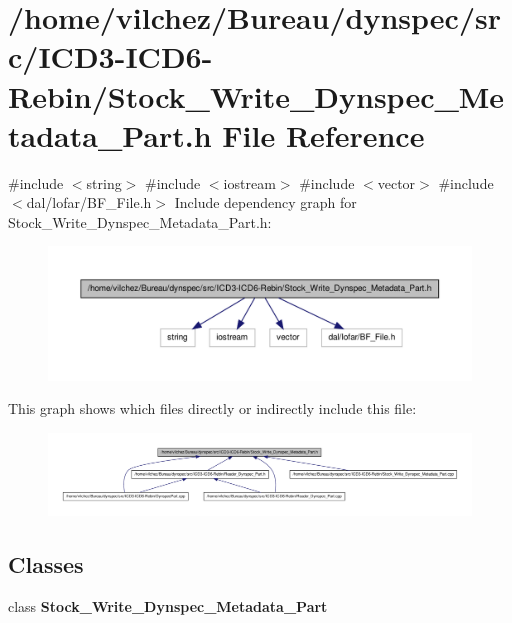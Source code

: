 \section{/home/vilchez/\-Bureau/dynspec/src/\-I\-C\-D3-\/\-I\-C\-D6-\/\-Rebin/\-Stock\-\_\-\-Write\-\_\-\-Dynspec\-\_\-\-Metadata\-\_\-\-Part.h \-File \-Reference}
\label{_stock___write___dynspec___metadata___part_8h}
{\ttfamily \#include $<$string$>$}\*
{\ttfamily \#include $<$iostream$>$}\*
{\ttfamily \#include $<$vector$>$}\*
{\ttfamily \#include $<$dal/lofar/\-B\-F\-\_\-\-File.\-h$>$}\*
\-Include dependency graph for \-Stock\-\_\-\-Write\-\_\-\-Dynspec\-\_\-\-Metadata\-\_\-\-Part.\-h\-:\nopagebreak
\begin{figure}[H]
\begin{center}
\leavevmode
\includegraphics[width=350pt]{_stock___write___dynspec___metadata___part_8h__incl}
\end{center}
\end{figure}
\-This graph shows which files directly or indirectly include this file\-:\nopagebreak
\begin{figure}[H]
\begin{center}
\leavevmode
\includegraphics[width=350pt]{_stock___write___dynspec___metadata___part_8h__dep__incl}
\end{center}
\end{figure}
\subsection*{\-Classes}
\begin{DoxyCompactItemize}
\item 
class {\bf \-Stock\-\_\-\-Write\-\_\-\-Dynspec\-\_\-\-Metadata\-\_\-\-Part}
\end{DoxyCompactItemize}

